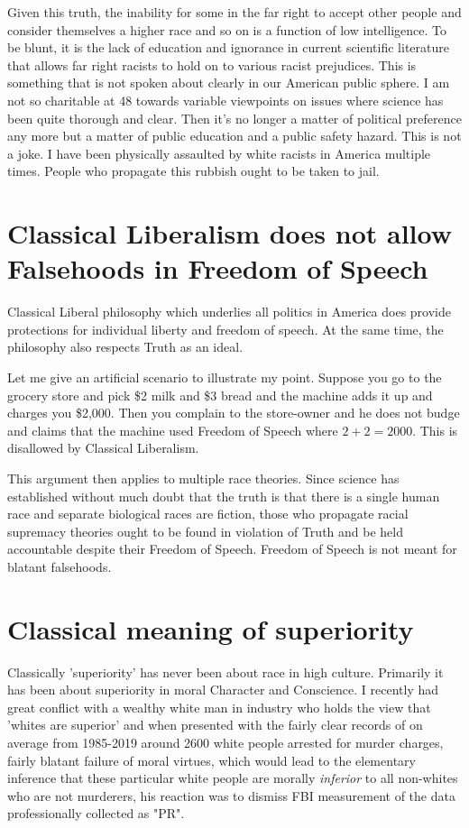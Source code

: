 \documentclass{amsart}
\begin{document}
Given this truth, the inability for some in the far right to accept other people and consider themselves a higher race and so on is a function of low intelligence.  To be blunt, it is the lack of education and ignorance in current scientific literature that allows far right racists to hold on to various racist prejudices.  This is something that is not spoken about clearly in our American public sphere.  I am not so charitable at 48 towards variable viewpoints on issues where science has been quite thorough and clear.  Then it's no longer a matter of political preference any more but a matter of public education and a public safety hazard.  This is not a joke.  I have been physically assaulted by white racists in America multiple times.  People who propagate this rubbish ought to be taken to jail.

\section{Classical Liberalism does not allow Falsehoods in Freedom of Speech}

Classical Liberal philosophy which underlies all politics in America does provide protections for individual liberty and freedom of speech.  At the same time, the philosophy also respects Truth as an ideal.  

Let me give an artificial scenario to illustrate my point.  Suppose you go to the grocery store and pick \$2 milk and \$3 bread and the machine adds it up and charges you \$2,000.  Then you complain to the store-owner and he does not budge and claims that the machine used Freedom of Speech where $2 + 2 = 2000$.  This is disallowed by Classical Liberalism.  

This argument then applies to multiple race theories.  Since science has established without much doubt that the truth is that there is a single human race and separate biological races are fiction, those who propagate racial supremacy theories ought to be found in violation of Truth and be held accountable despite their Freedom of Speech.  Freedom of Speech is not meant for blatant falsehoods.

\section{Classical meaning of superiority}

Classically 'superiority' has never been about race in high culture.  Primarily it has been about superiority in moral Character and Conscience.  I recently had great conflict with a wealthy white man in industry who holds the view that 'whites are superior' and when presented with the fairly clear records of on average from 1985-2019 around 2600 white people arrested for murder charges, fairly blatant failure of moral virtues, which would lead to the elementary inference that these particular white people are morally {\em inferior} to all non-whites who are not murderers, his reaction was to dismiss FBI measurement of the data professionally collected as "PR".  
\end{document}
